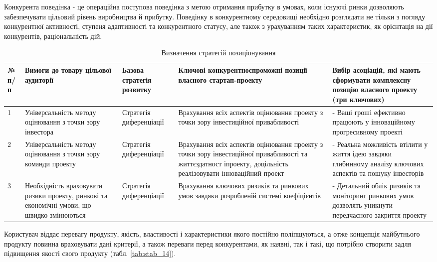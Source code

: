 Конкурента поведінка - це операційна поступова поведінка з метою отримання прибутку в умовах, коли існуючі ринки дозволяють забезпечувати цільовий рівень виробництва й прибутку. Поведінку в конкурентному середовищі необхідно розглядати не тільки з погляду конкурентної активності, ступеня адаптивності та конкурентного статусу, але також з урахуванням таких характеристик, як орієнтація на дії конкурентів, раціональність дій.
\begin{table}[h!]
\fontsize{12pt}{12pt}\selectfont
	\begin{tabularx}{\textwidth}{|l|X|X|X|X|}
    \hline
    № п/п & Вимоги до товару цільової аудиторії & Базова стратегія розвитку & Ключові конкурентноспроможні позиції власного стартап-проекту & Вибір асоціацій, які мають сформувати комплексну позицію власного проекту (три ключових) \\ \hline
    1 & Універсальність методу оцінювання з точки зору інвестора & Стратегія диференціації & Врахування всіх аспектів оцінювання проекту з точки зору інвестиційної привабливості & - Ваші гроші ефективно працюють у інноваційному прогресивному проекті \\ \hline
    2 & Універсальність методу оцінювання з точки зору команди проекту & Стратегія диференціації & Врахування всіх аспектів оцінювання проекту з точки зору інвестиційної привабливості та життєздатност іпроекту, доцільність реалізовувати інноваційний проект & - Реальна можливість втілити у життя ідею завдяки глибинному аналізу ключових аспектів та пошуку інвесторів \\ \hline
    3 & Необхідність враховувати ризики проекту, ринкові та економічні умови, що швидко змінюються & Стратегія диференціації & Врахування ключових ризиків та ринкових умов завдяки розробленій системі коефіцієнтів & - Детальний облік ризиків та моніторинг ринкових умов дозволять уникнути передчасного закриття проекту \\
    \hline
    \end{tabularx}
\caption{Визначення стратегій позиціонування} \label{tab:stab_13}
\end{table}

Користувач віддає перевагу продукту, якість, властивості і характеристики якого постійно поліпшуються, а отже концепція майбутнього продукту повинна враховувати дані критерії, а також переваги перед конкурентами, як наявні, так і такі, що потрібно створити задля підвищення якості свого продукту (табл. \ref{tab:stab_14}).

